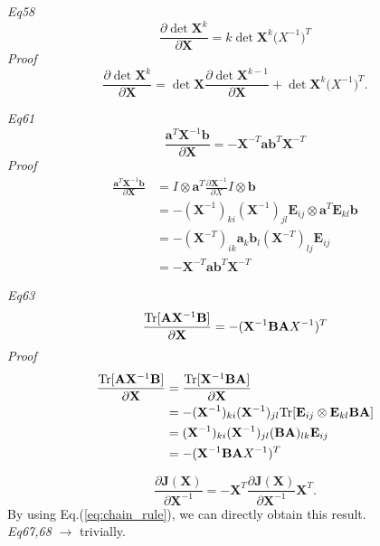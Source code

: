 \documentclass[a4paper,11pt]{article}
\def\tr{\mathrm{Tr}}
\def\m#1{\mathbf{#1}}
\begin{document}
\emph{Eq58}
\begin{equation}
    \frac{\partial \det \m X^k}{\partial \m X} = k \det \m X^k \m (X^{-1})^T
\end{equation}
\emph{Proof}
\begin{equation}
    \frac{\partial \det \m X^k}{\partial \m X} = \det \m X \frac{\partial \det \m X^{k-1}}{\partial \m X} + \det \m X^k \m (X^{-1})^T.
\end{equation}

\emph{Eq61}
\begin{equation}
    \frac{\m a^T \m X^{-1} \m b}{\partial \m X} = - \m X^{-T} \m a \m b^T \m X^{-T}
\end{equation}
\emph{Proof}
\begin{align}
    \frac{\m a^T \m X^{-1} \m b}{\partial \m X} & = I \otimes \m a^T \frac{\partial \m X^{-1}}{\partial X} I \otimes \m b \\ & = -(\m X^{-1})_{ki} (\m X^{-1})_{jl} \m E_{ij} \otimes \m a^T \m E_{kl} \m b \\ & = -(\m X^{-T})_{ik}\m a_{k} \m b_l (\m X^{-T})_{lj} \m E_{ij} \\ & = - \m X^{-T} \m a \m b^T \m X^{-T}
\end{align}

\emph{Eq63}
\begin{equation}
    \frac{\tr[\m A \m X^{-1} \m B]}{\partial \m X} = -(\m X^{-1}\m B \m A \m \m X^{-1})^T
\end{equation}
\emph{Proof}
\begin{align}
    \frac{\tr[\m A \m X^{-1} \m B]}{\partial \m X} & = \frac{\tr[\m X^{-1}\m B \m A]}{\partial \m X} \\ & = - (\m X^{-1})_{ki} (\m X^{-1})_{jl} \tr[\m E_{ij} \otimes \m E_{kl} \m B \m A] \\ & = (\m X^{-1})_{ki} (\m X^{-1})_{jl} (\m B \m A)_{lk} \m E_{ij} \\ 
    & = -(\m X^{-1}\m B \m A \m \m X^{-1})^T
\end{align}

\begin{equation}
    \frac{\partial \m J(\m X)}{\partial \m X^{-1}} = - \m X^T \frac{\partial \m J(\m X)}{\partial \m X^{-1}} \m X^T. 
\end{equation}
By using Eq.(\ref{eq:chain_rule}), we can directly obtain this result. \\

\emph{Eq67,68} $\to$ trivially. \\
\end{document}

